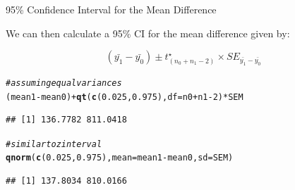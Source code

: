 \documentclass[10pt]{beamer}\usepackage[]{graphicx}\usepackage[]{color}
\makeatletter
\newcommand{\hlnum}[1]{\textcolor[rgb]{0.686,0.059,0.569}{#1}}%
\newcommand{\hlcom}[1]{\textcolor[rgb]{0.678,0.584,0.686}{\textit{#1}}}%
\newcommand{\hlopt}[1]{\textcolor[rgb]{0,0,0}{#1}}%
\newcommand{\hlstd}[1]{\textcolor[rgb]{0.345,0.345,0.345}{#1}}%
\newcommand{\hlkwc}[1]{\textcolor[rgb]{0.333,0.667,0.333}{#1}}%
\newcommand{\hlkwd}[1]{\textcolor[rgb]{0.737,0.353,0.396}{\textbf{#1}}}%
\newenvironment{kframe}{%
 \def\at@end@of@kframe{}%
 \ifinner\ifhmode%
  \def\at@end@of@kframe{\end{minipage}}%
  \begin{minipage}{\columnwidth}%
 \fi\fi%
 \def\FrameCommand##1{\hskip\@totalleftmargin \hskip-\fboxsep
 \colorbox{shadecolor}{##1}\hskip-\fboxsep
     \hskip-\linewidth \hskip-\@totalleftmargin \hskip\columnwidth}%
 \MakeFramed {\advance\hsize-\width
   \@totalleftmargin\z@ \linewidth\hsize
   \@setminipage}}%
 {\par\unskip\endMakeFramed%
 \at@end@of@kframe}
\newenvironment{knitrout}{}{} %
\makeatother
\begin{document}
\begin{frame}[fragile]{95\% Confidence Interval for the Mean Difference}
	
	We can then calculate a 95\% CI for the mean difference given by:
	
	\begin{equation}
		(\bar{y_1} - \bar{y_0}) \pm t^\star_{(n_0 + n_1 - 2)} \times SE_{\bar{y_1} - \bar{y_0}}
	\end{equation}
	
	\pause 
	
\begin{knitrout}\scriptsize
{}\color{fgcolor}\begin{kframe}
\begin{alltt}
\hlcom{# assuming equal variances}
\hlstd{(mean1} \hlopt{-} \hlstd{mean0)} \hlopt{+} \hlkwd{qt}\hlstd{(}\hlkwd{c}\hlstd{(}\hlnum{0.025}\hlstd{,} \hlnum{0.975}\hlstd{),} \hlkwc{df} \hlstd{= n0} \hlopt{+} \hlstd{n1} \hlopt{-} \hlnum{2}\hlstd{)} \hlopt{*} \hlstd{SEM}
\end{alltt}
\begin{verbatim}
## [1] 136.7782 811.0418
\end{verbatim}
\begin{alltt}
\hlcom{# similar to z interval}
\hlkwd{qnorm}\hlstd{(}\hlkwd{c}\hlstd{(}\hlnum{0.025}\hlstd{,} \hlnum{0.975}\hlstd{),} \hlkwc{mean} \hlstd{= mean1} \hlopt{-} \hlstd{mean0,} \hlkwc{sd} \hlstd{= SEM)}
\end{alltt}
\begin{verbatim}
## [1] 137.8034 810.0166
\end{verbatim}
\end{kframe}
\end{knitrout}
	
	
\end{frame}
\end{document}
